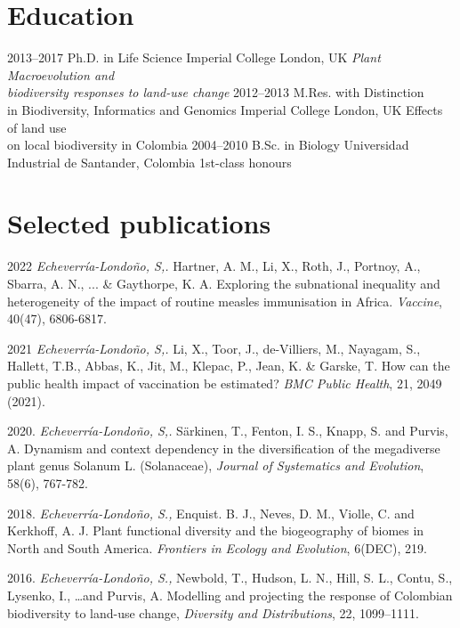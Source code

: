 \documentclass[icon]{twentysecondcv}
\begin{document}
\section{Education}

\begin{twenty}
  \twentyitem
    {2013--2017}
    {Ph.D. {\normalfont in Life Science}}
    {Imperial College London, UK}
    {\emph{Plant Macroevolution and \\  biodiversity responses to land-use change}}
  \twentyitem
    {2012--2013}
    {M.Res. with Distinction \\  {\normalfont in Biodiversity, Informatics and Genomics}}
    {Imperial College London, UK}
    {Effects of land use  \\  on local biodiversity in Colombia}
  \twentyitem
    {2004--2010}
    {B.Sc. in Biology}
    {Universidad Industrial de Santander, Colombia}
    {1st-class honours}
 \end{twenty}
 
 
 \section{Selected publications}

2022 \textit{Echeverr\'ia-Londo\~no, S,.}  Hartner, A. M., Li, X., Roth, J., Portnoy, A., Sbarra, A. N., ... \& Gaythorpe, K. A. Exploring the subnational inequality and heterogeneity of the impact of routine measles immunisation in Africa. \textit{Vaccine}, 40(47), 6806-6817. 

2021 \textit{Echeverr\'ia-Londo\~no, S,.}  Li, X., Toor, J., de-Villiers, M., Nayagam, S., Hallett, T.B., Abbas, K., Jit, M., Klepac, P., Jean, K. \&  Garske, T. How can the public health impact of vaccination be estimated? \textit{BMC Public Health}, 21, 2049 (2021).

2020. \textit{Echeverr\'ia-Londo\~no, S,.}  S{\"a}rkinen, T., Fenton, I. S., Knapp, S. and Purvis, A. Dynamism and context dependency in the diversification of the megadiverse plant genus Solanum L. (Solanaceae), \textit{Journal of Systematics and Evolution},  58(6), 767-782. 

2018. \textit{Echeverr\'ia-Londo\~no, S.,} Enquist. B. J., Neves, D. M., Violle, C. and Kerkhoff, A. J. Plant functional diversity and the biogeography of biomes in North and South America. \textit{Frontiers in Ecology and Evolution}, 6(DEC), 219.

2016. \textit{Echeverr\'ia-Londo\~no, S.,} Newbold, T., Hudson, L. N., Hill, S. L., Contu, S., Lysenko, I., \dots and Purvis, A. Modelling and projecting the response of Colombian biodiversity to land-use change, \textit{Diversity and Distributions}, 22, 1099--1111. 


\end{document}
